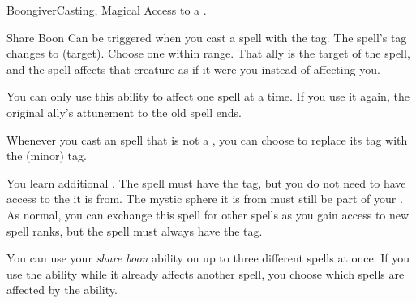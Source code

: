   \begin{magicalfeat}{Boongiver}{Casting, Magical}
    \featpre Access to a .

    \begin{magicalactiveability}{Share Boon}
      \abilityusagetime Can be triggered when you cast a spell with the  tag.
      \rankline
      The spell's  tag changes to  (target).
      Choose one  within \rngmed range.
      That ally is the target of the spell, and the spell affects that creature as if it were you instead of affecting you.

      You can only use this ability to affect one spell at a time.
      If you use it again, the original ally's attunement to the old spell ends.
    \end{magicalactiveability}

     Whenever you cast an  spell that is not a , you can choose to replace its  tag with the  (minor) tag.

     You learn additional .
    The spell must have the  tag, but you do not need to have access to the  it is from.
    The mystic sphere it is from must still be part of your .
    As normal, you can exchange this spell for other spells as you gain access to new spell ranks, but the spell must always have the  tag.

     You can use your \textit{share boon} ability on up to three different spells at once.
    If you use the ability while it already affects another spell, you choose which spells are affected by the ability.
  \end{magicalfeat}


